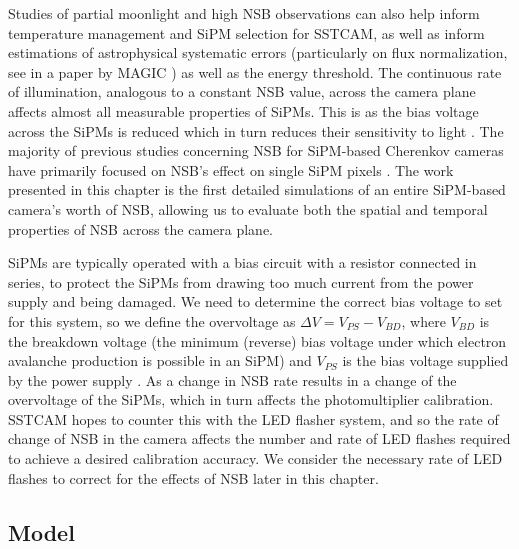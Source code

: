Studies of partial moonlight and high NSB observations can also help inform temperature management and SiPM selection for SSTCAM, as well as inform estimations of astrophysical systematic errors (particularly on flux normalization, see in a paper by MAGIC \cite{magicmoon}) as well as the energy threshold. The continuous rate of illumination, analogous to a constant NSB value, across the camera plane affects almost all measurable properties of SiPMs. This is as the bias voltage across the SiPMs is reduced which in turn reduces their sensitivity to light \cite{1mhighnsb}. The majority of previous studies concerning NSB for SiPM-based Cherenkov cameras have primarily focused on NSB's effect on single SiPM pixels \cite{2msipm} \cite{1mcalib} \cite{1mhighnsb} \cite{lstnsb}. The work presented in this chapter is the first detailed simulations of an entire SiPM-based camera's worth of NSB, allowing us to evaluate both the spatial and temporal properties of NSB across the camera plane.

SiPMs are typically operated with a bias circuit with a resistor connected in series, to protect the SiPMs from drawing too much current from the power supply and being damaged. We need to determine the correct bias voltage to set for this system, so we define the overvoltage as $\Delta V=V_{PS}-V_{BD}$, where $V_{BD}$ is the breakdown voltage (the minimum (reverse) bias voltage under which electron avalanche production is possible in an SiPM) and $V_{PS}$ is the bias voltage supplied by the power supply \cite{1mhighnsb}. As a change in NSB rate results in a change of the overvoltage of the SiPMs, which in turn affects the photomultiplier calibration. SSTCAM hopes to counter this with the LED flasher system, and so the rate of change of NSB in the camera affects the number and rate of LED flashes required to achieve a desired calibration accuracy. We consider the necessary rate of LED flashes to correct for the effects of NSB later in this chapter.
\subsection{Model}
\label{sec:intro:model}

